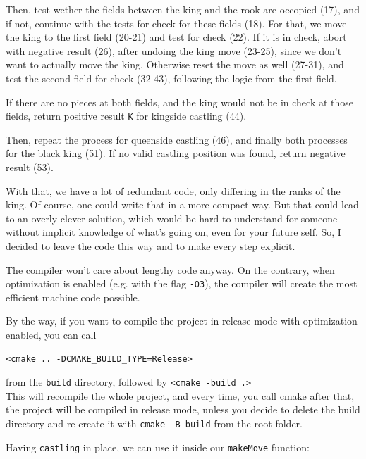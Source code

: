 Then, test wether the fields between the king and the rook are occopied (17), and if not, continue
with the tests for check for these fields (18).
For that, we move the king to the first field (20-21) and test for check (22).
If it is in check, abort with negative result (26), after undoing the king move (23-25), since we don't
want to actually move the king.
Otherwise reset the move as well (27-31), and test the second field for check (32-43), following the logic
from the first field.

If there are no pieces at both fields, and the king would not be in check at those fields, return
positive result \texttt{K} for kingside castling (44).

Then, repeat the process for queenside castling (46), and finally both processes for the black king (51).
If no valid castling position was found, return negative result (53).

With that, we have a lot of redundant code, only differing in the ranks of the king.
Of course, one could write that in a more compact way.
But that could lead to an overly clever solution, which would be hard to understand for someone without
implicit knowledge of what's going on, even for your future self.
So, I decided to leave the code this way and to make every step explicit.

The compiler won't care about lengthy code anyway.
On the contrary, when optimization is enabled (e.g. with the flag \texttt{-O3}),
the compiler will create the most efficient machine code possible.

By the way, if you want to compile the project in release mode with optimization enabled, you can call
\begin{verbatim}
<cmake .. -DCMAKE_BUILD_TYPE=Release>
\end{verbatim}
from the \texttt{build} directory, followed by \texttt{<cmake -build .>}\\
This will recompile the whole project, and every time, you call cmake after that, the project will be
compiled in release mode, unless you decide to delete the build directory and re-create it with
\texttt{cmake -B build} from the root folder.

Having \texttt{castling} in place, we can use it inside our \texttt{makeMove} function:

